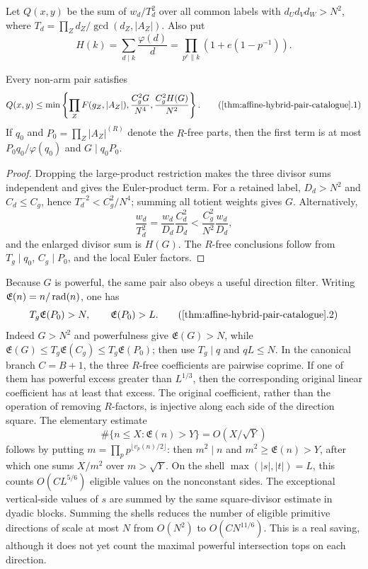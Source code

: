 Let $Q(x,y)$ be the sum of $w_d/T_d^2$ over all common labels with
$d_Ud_Vd_W>N^2$, where
$T_d=\prod_Zd_Z/\gcd(d_Z,|A_Z|)$.  Also put
\[
 H(k)=\sum_{d\mid k}\frac{\varphi(d)}d
 =\prod_{p^e\parallel k}\left(1+e(1-p^{-1})\right).
\]

\begin{theorem}
\label{thm:affine-hybrid-pair-catalogue}
Every non-arm pair satisfies
\[
 Q(x,y)\le
 \min\left\{
   \prod_ZF(g_Z,|A_Z|),
   \frac{C_g^2G}{N^4},
   \frac{C_g^2H(G)}{N^2}
 \right\}.                                               \tag{\ref{thm:affine-hybrid-pair-catalogue}.1}
\]
If $q_0$ and $P_0=\prod_Z|A_Z|^{(R)}$ denote the $R$-free parts, then the
first term is at most $P_0q_0/\varphi(q_0)$ and $G\mid q_0P_0$.
\end{theorem}

\begin{proof}
Dropping the large-product restriction makes the three divisor sums
independent and gives the Euler-product term.  For a retained label,
$D_d>N^2$ and $C_d\le C_g$, hence
$T_d^{-2}<C_g^2/N^4$; summing all totient weights gives $G$.
Alternatively,
\[
 \frac{w_d}{T_d^2}
 =\frac{w_d}{D_d}\frac{C_d^2}{D_d}
 <\frac{C_g^2}{N^2}\frac{w_d}{D_d},
\]
and the enlarged divisor sum is $H(G)$.  The $R$-free conclusions follow
from $T_g\mid q_0$, $C_g\mid P_0$, and the local Euler factors.
\end{proof}

Because $G$ is powerful, the same pair also obeys a useful direction
filter.  Writing $\mathfrak E(n)=n/\operatorname{rad}(n)$, one has
\[
             T_g\mathfrak E(P_0)>N,\qquad \mathfrak E(P_0)>L.          \tag{\ref{thm:affine-hybrid-pair-catalogue}.2}
\]
Indeed $G>N^2$ and powerfulness give
$\mathfrak E(G)>N$, while
$\mathfrak E(G)\le T_g\mathfrak E(C_g)\le T_g\mathfrak E(P_0)$;
then use $T_g\mid q$ and $qL\le N$.  In the canonical branch $C=B+1$,
the three $R$-free coefficients are pairwise coprime.  If one of them has
powerful excess greater than $L^{1/3}$, then the corresponding original
linear coefficient has at least that excess.  The original coefficient,
rather than the operation of removing $R$-factors, is injective along each
side of the direction square.  The elementary estimate
\[
 \#\{n\le X:\mathfrak E(n)>Y\}=O(X/\sqrt Y)
\]
follows by putting $m=\prod_pp^{\lfloor v_p(n)/2\rfloor}$: then
$m^2\mid n$ and $m^2\ge\mathfrak E(n)>Y$, after which one sums
$X/m^2$ over $m>\sqrt Y$.  On the shell
$\max(|s|,|t|)=L$, this counts $O(CL^{5/6})$ eligible values on the
nonconstant sides.  The exceptional vertical-side values of $s$ are summed
by the same square-divisor estimate in dyadic blocks.  Summing the shells
reduces the number of eligible primitive directions of scale at most $N$
from $O(N^2)$ to $O(CN^{11/6})$.  This is a real saving, although it does
not yet count the maximal powerful intersection tops on each direction.

